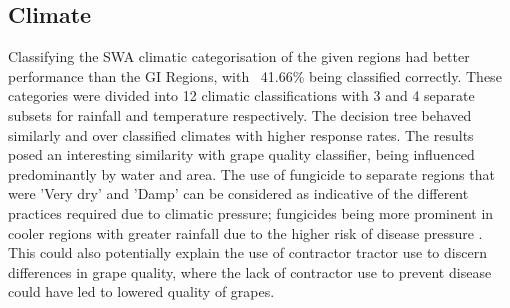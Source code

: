 \documentclass[review,12pt,authoryear]{elsarticle}
\begin{document}
\begin{linenumbers}

\subsection{Climate}
Classifying the SWA climatic categorisation of the given regions had better performance than the GI Regions, with ~41.66\% being classified correctly. These categories were divided into 12 climatic classifications with 3 and 4 separate subsets for rainfall and temperature respectively. The decision tree behaved similarly and over classified climates with higher response rates. The results posed an interesting similarity with grape quality classifier, being influenced predominantly by water and area. The use of fungicide to separate regions that were 'Very dry' and 'Damp' can be considered as indicative of the different practices required due to climatic pressure; fungicides being more prominent in cooler regions with greater rainfall due to the higher risk of disease pressure \citep{reynoldsManagingWineQuality2010}. %
 This could also potentially explain the use of contractor tractor use to discern differences in grape quality, where the lack of contractor use to prevent disease could have led to lowered quality of grapes.



\end{linenumbers}
\end{document}
